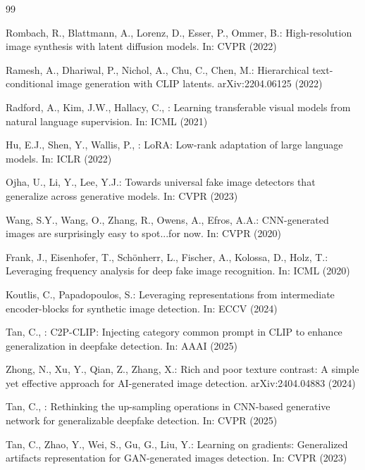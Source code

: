 \documentclass[runningheads]{llncs}
\begin{document}

\begin{thebibliography}{99}

Rombach, R., Blattmann, A., Lorenz, D., Esser, P., Ommer, B.: High-resolution image synthesis with latent diffusion models. In: CVPR (2022)

Ramesh, A., Dhariwal, P., Nichol, A., Chu, C., Chen, M.: Hierarchical text-conditional image generation with CLIP latents. arXiv:2204.06125 (2022)

Radford, A., Kim, J.W., Hallacy, C., \etal: Learning transferable visual models from natural language supervision. In: ICML (2021)

Hu, E.J., Shen, Y., Wallis, P., \etal: LoRA: Low-rank adaptation of large language models. In: ICLR (2022)

Ojha, U., Li, Y., Lee, Y.J.: Towards universal fake image detectors that generalize across generative models. In: CVPR (2023)

Wang, S.Y., Wang, O., Zhang, R., Owens, A., Efros, A.A.: CNN-generated images are surprisingly easy to spot...for now. In: CVPR (2020)

Frank, J., Eisenhofer, T., Sch{\"o}nherr, L., Fischer, A., Kolossa, D., Holz, T.: Leveraging frequency analysis for deep fake image recognition. In: ICML (2020)

Koutlis, C., Papadopoulos, S.: Leveraging representations from intermediate encoder-blocks for synthetic image detection. In: ECCV (2024)

Tan, C., \etal: C2P-CLIP: Injecting category common prompt in CLIP to enhance generalization in deepfake detection. In: AAAI (2025)

Zhong, N., Xu, Y., Qian, Z., Zhang, X.: Rich and poor texture contrast: A simple yet effective approach for AI-generated image detection. arXiv:2404.04883 (2024)

Tan, C., \etal: Rethinking the up-sampling operations in CNN-based generative network for generalizable deepfake detection. In: CVPR (2025)

Tan, C., Zhao, Y., Wei, S., Gu, G., Liu, Y.: Learning on gradients: Generalized artifacts representation for GAN-generated images detection. In: CVPR (2023)


\end{thebibliography}
\end{document}

